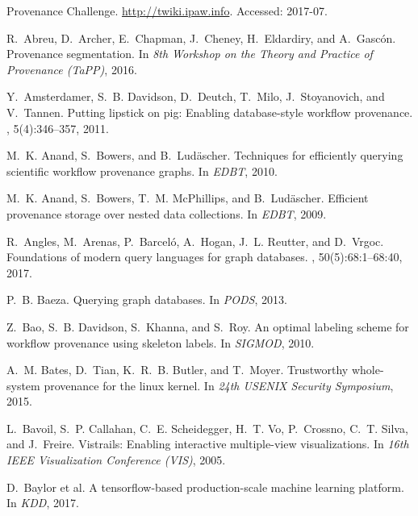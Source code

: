 \documentclass[11pt]{article}
\begin{document}
\begin{thebibliography}{10}

{Provenance Challenge}.
\newblock \url{http://twiki.ipaw.info}.
\newblock Accessed: 2017-07.

R.~Abreu, D.~Archer, E.~Chapman, J.~Cheney, H.~Eldardiry, and A.~Gasc{\'o}n.
\newblock Provenance segmentation.
\newblock In {\em 8th Workshop on the Theory and Practice of Provenance
  (TaPP)}, 2016.

Y.~Amsterdamer, S.~B. Davidson, D.~Deutch, T.~Milo, J.~Stoyanovich, and
  V.~Tannen.
\newblock Putting lipstick on pig: Enabling database-style workflow provenance.
, 5(4):346--357, 2011.

M.~K. Anand, S.~Bowers, and B.~Lud{\"{a}}scher.
\newblock Techniques for efficiently querying scientific workflow provenance
  graphs.
\newblock In {\em {EDBT}}, 2010.

M.~K. Anand, S.~Bowers, T.~M. McPhillips, and B.~Lud{\"{a}}scher.
\newblock Efficient provenance storage over nested data collections.
\newblock In {\em {EDBT}}, 2009.

R.~Angles, M.~Arenas, P.~Barcel{\'{o}}, A.~Hogan, J.~L. Reutter, and D.~Vrgoc.
\newblock Foundations of modern query languages for graph databases.
, 50(5):68:1--68:40, 2017.

P.~B. Baeza.
\newblock Querying graph databases.
\newblock In {\em PODS}, 2013.

Z.~Bao, S.~B. Davidson, S.~Khanna, and S.~Roy.
\newblock An optimal labeling scheme for workflow provenance using skeleton
  labels.
\newblock In {\em SIGMOD}, 2010.

A.~M. Bates, D.~Tian, K.~R.~B. Butler, and T.~Moyer.
\newblock Trustworthy whole-system provenance for the linux kernel.
\newblock In {\em 24th {USENIX} Security Symposium}, 2015.

L.~Bavoil, S.~P. Callahan, C.~E. Scheidegger, H.~T. Vo, P.~Crossno, C.~T.
  Silva, and J.~Freire.
\newblock Vistrails: Enabling interactive multiple-view visualizations.
\newblock In {\em 16th {IEEE} Visualization Conference (VIS)}, 2005.

D.~Baylor et al. 
 {A} tensorflow-based production-scale machine learning
  platform.
\newblock In {\em KDD}, 2017.


\end{thebibliography}
\end{document}
